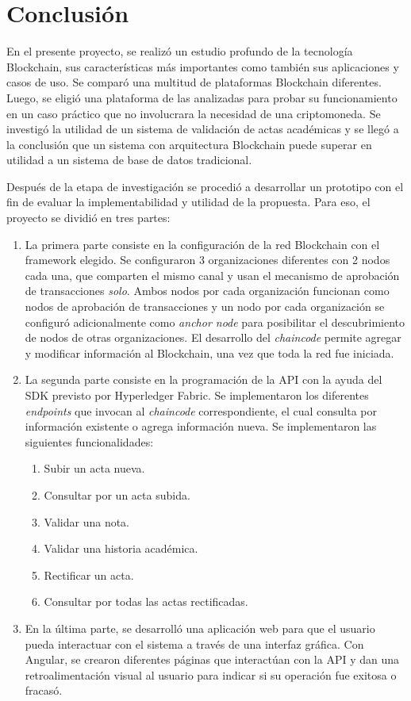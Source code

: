 \chapter{Conclusión} %
\label{Chapter7}

En el presente proyecto, se realizó un estudio profundo de la tecnología Blockchain, sus características más importantes como también sus aplicaciones y casos de uso. Se comparó una multitud de plataformas Blockchain diferentes. Luego, se eligió una plataforma de las analizadas para probar su funcionamiento en un caso práctico que no involucrara la necesidad de una criptomoneda. Se investigó la utilidad de un sistema de validación de actas académicas y se llegó a la conclusión que un sistema con arquitectura Blockchain puede superar en utilidad a un sistema de base de datos tradicional.

Después de la etapa de investigación se procedió a desarrollar un prototipo con el fin de evaluar la implementabilidad y utilidad de la propuesta. Para eso, el proyecto se dividió en tres partes: 

\begin{enumerate}
    \item La primera parte consiste en la configuración de la red Blockchain con el framework elegido. Se configuraron 3 organizaciones diferentes con 2 nodos cada una, que comparten el mismo canal y usan el mecanismo de aprobación de transacciones \textit{solo}. Ambos nodos por cada organización funcionan como nodos de aprobación de transacciones y un nodo por cada organización se configuró adicionalmente como \textit{anchor node} para posibilitar el descubrimiento de nodos de otras organizaciones. El desarrollo del \textit{chaincode} permite agregar y modificar información al Blockchain, una vez que toda la red fue iniciada.
    \item La segunda parte consiste en la programación de la API con la ayuda del SDK previsto por Hyperledger Fabric. Se implementaron los diferentes \textit{endpoints} que invocan al \textit{chaincode} correspondiente, el cual consulta por información existente o agrega información nueva. Se implementaron las siguientes funcionalidades:
    \begin{enumerate}
        \item Subir un acta nueva.
        \item Consultar por un acta subida.
        \item Validar una nota.
        \item Validar una historia académica.
        \item Rectificar un acta.
        \item Consultar por todas las actas rectificadas.
    \end{enumerate}
    \item En la última parte, se desarrolló una aplicación web para que el usuario pueda interactuar con el sistema a través de una interfaz gráfica. Con Angular, se crearon diferentes páginas que interactúan con la API y dan una retroalimentación visual al usuario para indicar si su operación fue exitosa o fracasó.
\end{enumerate}

